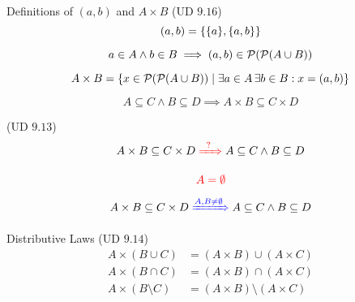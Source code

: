 \begin{frame}{}
  \begin{exampleblock}{Definitions of $(a,b)$ and $A \times B$ (UD $9.16$)}
    \[
      (a, b) = \{\{a\}, \{a,b\}\}
    \]

    \[
      a \in A \land b \in B \implies (a, b) \in \mathcal{P}(\mathcal{P}(A \cup B))
    \]

    \pause
    \[
      A \times B = \{x \in \mathcal{P}(\mathcal{P}(A \cup B)) \mid \exists a \in A \,\exists b \in B : x = (a,b)\}
    \]

    \[
      A \subseteq C \land B \subseteq D \implies A \times B \subseteq C \times D
    \]
  \end{exampleblock}
\end{frame}

\begin{frame}{}
  \begin{exampleblock}{(UD $9.13$)}
    \[
      A \times B \subseteq C \times D \;\textcolor{red}{\xRightarrow{\;\;?\;\;}}\; A \subseteq C \land B \subseteq D
    \]
  \end{exampleblock}

  \[
    \textcolor{red}{A = \emptyset}
  \]

  \[
    A \times B \subseteq C \times D \;\textcolor{blue}{\xRightarrow{A, B \neq \emptyset}}\; A \subseteq C \land B \subseteq D
  \]

  \centerline{}
\end{frame}

\begin{frame}{}
  \begin{exampleblock}{Distributive Laws (UD $9.14$)}
    \begin{align*}
      A \times (B \cup C) &= (A \times B) \cup (A \times C) \\
      A \times (B \cap C) &= (A \times B) \cap (A \times C) \\
      A \times (B \setminus C) &= (A \times B) \setminus (A \times C)
    \end{align*}
  \end{exampleblock}

\end{frame}
